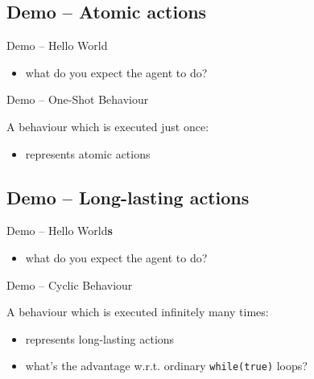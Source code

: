 \documentclass{beamer}\mode<presentation>{\usetheme{AMSCesenaPurpleAndGold}}
\begin{document}
\startDemo

\subsection{Demo \currentDemo{} -- Atomic actions}

\begin{frame}{Demo \currentDemo{} -- Hello World}
	
	\begin{itemize}
		\item what do you expect the agent to do?
	\end{itemize}
\end{frame}

\begin{frame}{Demo \currentDemo{} -- One-Shot Behaviour}

	A behaviour which is executed just once:
	\vfill
	
	\begin{itemize}
		\item represents \alert{atomic} actions
	\end{itemize}
\end{frame}

\startDemo

\subsection{Demo \currentDemo{} -- Long-lasting actions}

\begin{frame}{Demo \currentDemo{} -- Hello World\textbf{s}}
	
	\begin{itemize}
		\item what do you expect the agent to do?
	\end{itemize}
\end{frame}

\begin{frame}{Demo \currentDemo{} -- Cyclic Behaviour}
	
	A behaviour which is executed infinitely many times:
	\vfill
	
	\begin{itemize}
		\item represents \alert{long-lasting} actions
		\item what's the advantage w.r.t. ordinary \texttt{while(true)} loops?
	\end{itemize}
\end{frame}
\end{document}
